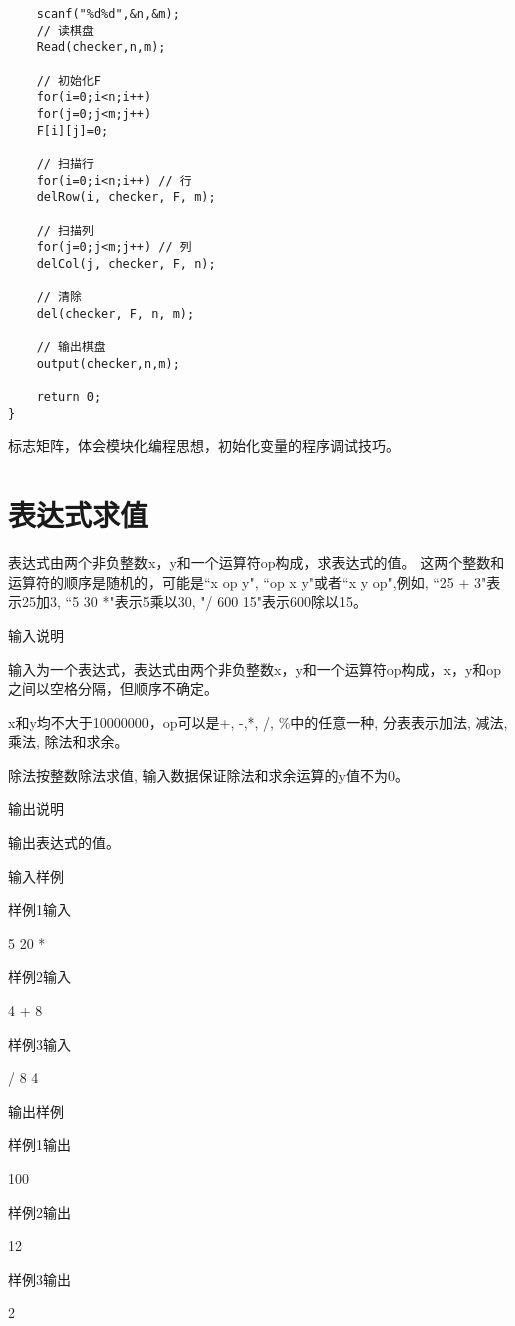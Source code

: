 \begin{lstlisting}
	scanf("%d%d",&n,&m);
	// 读棋盘 
	Read(checker,n,m);
	
	// 初始化F 
	for(i=0;i<n;i++)
	for(j=0;j<m;j++)
	F[i][j]=0;

	// 扫描行 
	for(i=0;i<n;i++) // 行 
	delRow(i, checker, F, m);
	
	// 扫描列 
	for(j=0;j<m;j++) // 列 
	delCol(j, checker, F, n);
	
	// 清除 
	del(checker, F, n, m);
	
	// 输出棋盘 
	output(checker,n,m); 
	
	return 0;																	
} 
\end{lstlisting}

\begin{note}[要点]
	标志矩阵，体会模块化编程思想，初始化变量的程序调试技巧。
\end{note}

\section{表达式求值}
表达式由两个非负整数x，y和一个运算符op构成，求表达式的值。
这两个整数和运算符的顺序是随机的，可能是``x op y", ``op x y"或者``x y op",例如, ``25 + 3"表示25加3, ``5 30 *"表示5乘以30, "/ 600 15"表示600除以15。

输入说明

输入为一个表达式，表达式由两个非负整数x，y和一个运算符op构成，x，y和op之间以空格分隔，但顺序不确定。

x和y均不大于10000000，op可以是+, -,*, /, \%中的任意一种, 分表表示加法, 减法, 乘法, 除法和求余。

除法按整数除法求值, 输入数据保证除法和求余运算的y值不为0。

输出说明	

输出表达式的值。

输入样例

样例1输入

5 20 *

样例2输入

4 + 8

样例3输入

/ 8 4

输出样例

样例1输出

100

样例2输出

12

样例3输出

2

